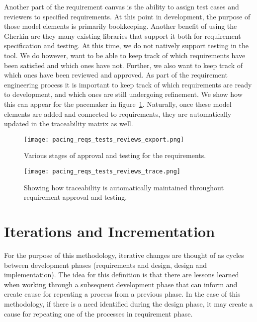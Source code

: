 Another part of the requirement canvas is the ability to assign test cases and reviewers to specified requirements. At this point in development, the purpose of those model elements is primarily bookkeeping. Another benefit of using the Gherkin are they many existing libraries that support it both for requirement specification and testing. At this time, we do not natively support testing in the tool. We do however, want to be able to keep track of which requirements have been satisfied and which ones have not. Further, we also want to keep track of which ones have been reviewed and approved. As part of the requirement engineering process it is important to keep track of which requirements are ready to development, and which ones are still undergoing refinement. We show how this can appear for the pacemaker in figure~\ref{fig:pacing_reqs_tests_reviews_export}. Naturally, once these model elements are added and connected to requirements, they are automatically updated in the traceability matrix as well.


\begin{figure}
	\centering
	\texttt{[image: pacing\_reqs\_tests\_reviews\_export.png]}
	\caption{Various stages of approval and testing for the requirements.}
	\label{fig:pacing_reqs_tests_reviews_export}
\end{figure}

\begin{figure}
	\centering
	\texttt{[image: pacing\_reqs\_tests\_reviews\_trace.png]}
	\caption{Showing how traceability is automatically maintained throughout requirement approval and testing.}
	\label{fig:pacing_reqs_tests_reviews_trace}
\end{figure}

\section{Iterations and Incrementation}

For the purpose of this methodology, iterative changes are thought of as cycles between development phases (requirements and design, design and implementation). The idea for this definition is that there are lessons learned when working through a subsequent development phase that can inform and create cause for repeating a process from a previous phase. In the case of this methodology, if there is a need identified during the design phase, it may create a cause for repeating one of the processes in requirement phase. 

